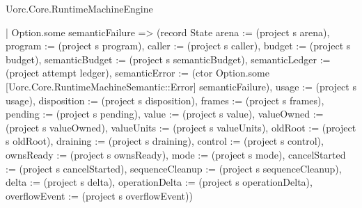 \begin{lexlean}{Uorc.Core.RuntimeMachineEngine}
\begin{semanticmodule}
{              | Option.some semanticFailure => (record State {arena := (project s arena), program := (project s program), caller := (project s caller), budget := (project s budget), semanticBudget := (project s semanticBudget), semanticLedger := (project attempt ledger), semanticError := (ctor Option.some [Uorc.Core.RuntimeMachineSemantic::Error] semanticFailure), usage := (project s usage), disposition := (project s disposition), frames := (project s frames), pending := (project s pending), value := (project s value), valueOwned := (project s valueOwned), valueUnits := (project s valueUnits), oldRoot := (project s oldRoot), draining := (project s draining), control := (project s control), ownsReady := (project s ownsReady), mode := (project s mode), cancelStarted := (project s cancelStarted), sequenceCleanup := (project s sequenceCleanup), delta := (project s delta), operationDelta := (project s operationDelta), overflowEvent := (project s overflowEvent)})
}
\end{semanticmodule}
\end{lexlean}
